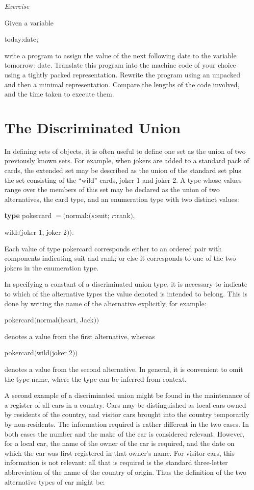 \noindent
\textit{Exercise}
\nopagebreak

\noindent
Given a variable

\quad today:date;

\noindent
write a program to assign the value of the next following date to the variable tomorrow: date. Translate this program into the machine code of your choice using a tightly packed representation. Rewrite the program using an unpacked and then a minimal representation. Compare the lengths of the code involved, and the time taken to execute them.

\section[The discriminated union]{The Discriminated Union}

In defining sets of objects, it is often useful to define one set as the union of two previously known sets. For example, when jokers are added to a standard pack of cards, the extended set may be described as the union of the standard set plus the set consisting of the ``wild'' cards, joker 1 and joker 2. A type whose values range over the members of this set may be declared as the union of two alternatives, the card type, and an enumeration type with two distinct values:

\quad \textbf{type} pokercard $= ($normal:$(s$:suit; $r$:rank$)$,

\tabto{10.2em}wild:$($joker 1, joker 2$))$.

\noindent
Each value of type pokercard corresponds either to an ordered pair with components indicating suit and rank; or else it corresponds to one of the two jokers in the enumeration type.

In specifying a constant of a discriminated union type, it is necessary to indicate to which of the alternative types the value denoted is intended to belong. This is done by writing the name of the alternative explicitly, for example:

\quad pokercard$($normal$($heart, Jack$))$

\noindent
denotes a value from the first alternative, whereas

\quad pokercard$($wild$($joker 2$))$

\noindent
denotes a value from the second alternative. In general, it is convenient to omit the type name, where the type can be inferred from context.

A second example of a discriminated union might be found in the maintenance of a register of all cars in a country. Cars may be distinguished as local cars owned by residents of the country, and visitor cars brought into the country temporarily by non-residents. The information required is rather different in the two cases. In both cases the number and the make of the car is considered relevant. However, for a local car, the name of the owner of the car is required, and the date on which the car was first registered in that owner's name. For visitor cars, this information is not relevant: all that is required is the standard three-letter abbreviation of the name of the country of origin. Thus the definition of the two alternative types of car might be:

